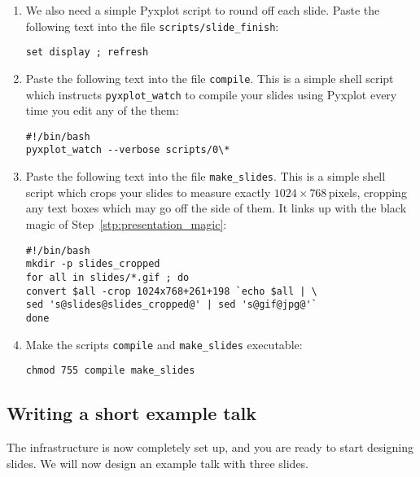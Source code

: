 \begin{enumerate}
\item We also need a simple Pyxplot script to round off each slide. Paste the
following text into the file {\tt scripts/slide\_finish}:
\begin{verbatim}
set display ; refresh
\end{verbatim}
\item Paste the following text into the file {\tt compile}. This is a simple
shell script which instructs {\tt pyxplot\_watch} to compile your slides using
Pyxplot every time you edit any of the them:
\begin{verbatim}
#!/bin/bash
pyxplot_watch --verbose scripts/0\*
\end{verbatim}
\item Paste the following text into the file {\tt make\_slides}. This is a
simple shell script which crops your slides to measure exactly
$1024\times768$\,pixels, cropping any text boxes which may go off the side of
them. It links up with the black magic of Step~\ref{stp:presentation_magic}:
\begin{verbatim}
#!/bin/bash
mkdir -p slides_cropped
for all in slides/*.gif ; do
convert $all -crop 1024x768+261+198 `echo $all | \
sed 's@slides@slides_cropped@' | sed 's@gif@jpg@'`
done
\end{verbatim}
\item Make the scripts {\tt compile} and {\tt make\_slides} executable:
\begin{verbatim}
chmod 755 compile make_slides
\end{verbatim}
\end{enumerate}

\subsection{Writing a short example talk}

The infrastructure is now completely set up, and you are ready to start
designing slides. We will now design an example talk with three slides.

